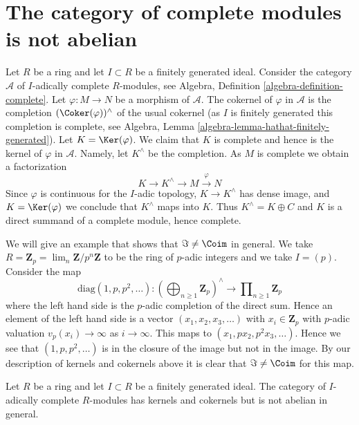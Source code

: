 \section{The category of complete modules is not abelian}
\label{section-non-abelian}


\noindent
Let $R$ be a ring and let $I \subset R$ be a finitely generated ideal.
Consider the category $\mathcal{A}$ of $I$-adically complete
$R$-modules, see
Algebra, Definition \ref{algebra-definition-complete}.
Let $\varphi : M \to N$ be a morphism of $\mathcal{A}$.
The cokernel of $\varphi$ in $\mathcal{A}$ is the completion
$(\Coker(\varphi))^\wedge$ of the usual cokernel
(as $I$ is finitely generated this completion is complete, see
Algebra, Lemma \ref{algebra-lemma-hathat-finitely-generated}).
Let $K = \Ker(\varphi)$. We claim that $K$ is complete and
hence is the kernel of $\varphi$ in $\mathcal{A}$. Namely, let
$K^\wedge$ be the completion. As $M$ is complete we obtain a factorization
$$
K \to K^\wedge \to M \xrightarrow{\varphi} N
$$
Since $\varphi$ is continuous for the $I$-adic topology, $K \to K^\wedge$
has dense image, and $K = \Ker(\varphi)$ we conclude that $K^\wedge$
maps into $K$. Thus $K^\wedge = K \oplus C$ and $K$ is a direct summand
of a complete module, hence complete.

\medskip\noindent
We will give an example that shows that $\Im \not = \Coim$
in general. We take $R = \mathbf{Z}_p = \lim_n \mathbf{Z}/p^n\mathbf{Z}$
to be the ring of $p$-adic integers and we take $I = (p)$.
Consider the map
$$
\text{diag}(1, p, p^2, \ldots) :
\left(\bigoplus\nolimits_{n \geq 1} \mathbf{Z}_p\right)^\wedge
\longrightarrow
\prod\nolimits_{n \geq 1} \mathbf{Z}_p
$$
where the left hand side is the $p$-adic completion of the direct sum.
Hence an element of the left hand side is a vector $(x_1, x_2, x_3, \ldots)$
with $x_i \in \mathbf{Z}_p$ with $p$-adic valuation $v_p(x_i) \to \infty$ as
$i \to \infty$. This maps to $(x_1, px_2, p^2x_3, \ldots)$. Hence we see
that $(1, p, p^2, \ldots)$ is in the closure of the image but not in
the image. By our description of kernels and cokernels above it is
clear that $\Im \not = \Coim$ for this map.

\begin{lemma}
\label{lemma-complete-modules-not-abelian}
Let $R$ be a ring and let $I \subset R$ be a finitely generated ideal.
The category of $I$-adically complete $R$-modules has kernels and
cokernels but is not abelian in general.
\end{lemma}

